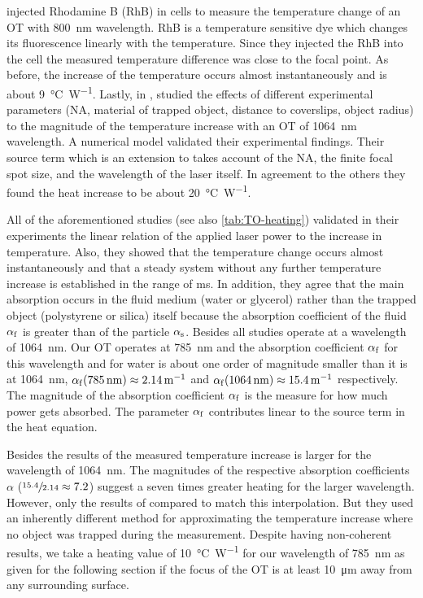  injected Rhodamine B (RhB) in cells to measure the 
temperature change of an OT with \SI{800}{\nm} wavelength. RhB is a temperature 
sensitive dye which changes its fluorescence linearly with the temperature. 
Since they injected the RhB into the cell the measured temperature difference 
was close to the focal point. As before, the increase of the temperature occurs 
almost instantaneously and is about \SI{9}{\degreeCelsius\per\watt}. Lastly, in 
\citeyear{Catala2017},  studied the effects of different 
experimental parameters (NA, material of trapped object, distance to 
coverslips, object radius) to the magnitude of the temperature increase with an 
OT of \SI{1064}{\nm} wavelength. A numerical model validated their experimental 
findings. Their source term which is an extension to  takes 
account of the NA, the finite focal spot size, and the wavelength of the laser 
itself. In agreement to the others they found the heat increase to be about 
\SI{20}{\degreeCelsius\per\watt}.

All of the aforementioned studies (see also \cref{tab:TO-heating}) validated in 
their experiments the linear relation of the applied laser power to the 
increase in temperature. Also, they showed that the temperature change occurs 
almost instantaneously and that a steady system without any further temperature 
increase is established in the range of \si{\ms}. In addition, they agree that 
the main absorption occurs in the fluid medium (water or glycerol) rather than 
the trapped object (polystyrene or silica) itself because the absorption 
coefficient of the fluid $\alpha_{\mathrm{f}}$ is greater than of the particle 
$\alpha_{\mathrm{s}}$. Besides \cite{Moreau2015} all studies operate at a 
wavelength of \SI{1064}{\nm}. Our OT operates at \SI{785}{\nm} and the 
absorption coefficient $\alpha_{\mathrm{f}}$ for this wavelength and for water is 
about one order of magnitude smaller than it is at \SI{1064}{\nm},
$\alpha_{\MR{f}}(\SI{785}{\nm}) \approx \SI{2.14}{\per\meter} $ and 
$\alpha_{\MR{f}}(\SI{1064}{\nm}) \approx \SI{15.4}{\per\meter} $ respectively. 
The magnitude of the absorption coefficient $\alpha_{\mathrm{f}}$ is the measure 
for how much power gets absorbed. The parameter $\alpha_{\mathrm{f}}$ contributes 
linear to the source term in the heat equation.

Besides the results of  the measured temperature increase 
is larger for the wavelength of \SI{1064}{\nm}. The magnitudes of the 
respective absorption coefficients $\alpha$ ($\sfrac{15.4}{2.14}\approx 7.2$) 
suggest a seven times greater heating for the larger wavelength. However, only 
the results of  compared to  match this 
interpolation. But they used an inherently different method for approximating 
the temperature increase where no object was trapped during the measurement. 
Despite having non-coherent results, we take a heating value of 
\SI{10}{\degreeCelsius\per\watt} for our wavelength of \SI{785}{\nm} as given 
for the following section if the focus of the OT is at least \SI{10}{\um} away 
from any surrounding surface.


